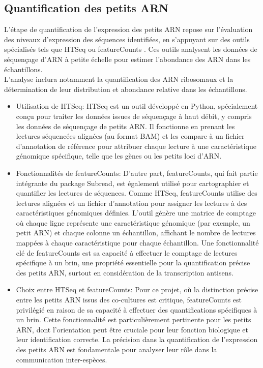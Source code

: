 \documentclass{report}
\begin{document}
\subsection{Quantification des petits ARN }
L'étape de quantification de l'expression des petits ARN repose sur l'évaluation des niveaux d'expression des séquences identifiées, en s'appuyant sur des outils spécialisés tels que HTSeq\cite{anders2015htseq} ou featureCounts \cite{liao2014featurecounts}. Ces outils analysent les données de séquençage d'ARN à petite échelle pour estimer l'abondance des ARN dans les échantillons.\\

L'analyse inclura notamment la quantification des ARN ribosomaux et la détermination de leur distribution et abondance relative dans les échantillons.\\

\begin{itemize}
    \item Utilisation de HTSeq:
    HTSeq est un outil développé en Python, spécialement conçu pour traiter les données issues de séquençage à haut débit, y compris les données de séquençage de petits ARN. Il fonctionne en prenant les lectures séquencées alignées (au format BAM) et les compare à un fichier d'annotation de référence pour attribuer chaque lecture à une caractéristique génomique spécifique, telle que les gènes ou les petits loci d'ARN.
    \item Fonctionnalités de featureCounts:
    D'autre part, featureCounts, qui fait partie intégrante du package Subread, est également utilisé pour cartographier et quantifier les lectures de séquences. Comme HTSeq, featureCounts utilise des lectures alignées et un fichier d'annotation pour assigner les lectures à des caractéristiques génomiques définies. L'outil génère une matrice de comptage où chaque ligne représente une caractéristique génomique (par exemple, un petit ARN) et chaque colonne un échantillon, affichant le nombre de lectures mappées à chaque caractéristique pour chaque échantillon. Une fonctionnalité clé de featureCounts est sa capacité à effectuer le comptage de lectures spécifique à un brin, une propriété essentielle pour la quantification précise des petits ARN, surtout en considération de la transcription antisens.
    \item Choix entre HTSeq et featureCounts:
    Pour ce projet, où la distinction précise entre les petits ARN issus des co-cultures est critique, featureCounts est privilégié en raison de sa capacité à effectuer des quantifications spécifiques à un brin. Cette fonctionnalité est particulièrement pertinente pour les petits ARN, dont l'orientation peut être cruciale pour leur fonction biologique et leur identification correcte. La précision dans la quantification de l'expression des petits ARN est fondamentale pour analyser leur rôle dans la communication inter-espèces.
\end{itemize} \vspace{.5cm}
\end{document}

